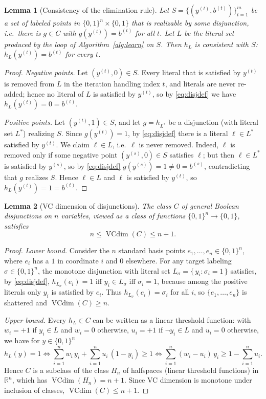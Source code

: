 \documentclass{amsart}
\newtheorem{lemma}{Lemma}
\theoremstyle{definition}
\theoremstyle{remark}
\newcommand{\R}{\mathbb{R}}
\DeclareMathOperator{\VCdim}{VCdim}
\begin{document}
\begin{lemma}[Consistency of the elimination rule]\label{lem:consistent}
Let $S=\{(y^{(t)},b^{(t)})\}_{t=1}^m$ be a set of labeled points in
$\{0,1\}^n\times\{0,1\}$ that is \emph{realizable} by some disjunction, i.e.\
there is $g\in C$ with $g(y^{(t)})=b^{(t)}$ for all $t$. Let $L$ be the literal
set produced by the loop of Algorithm~\ref{alg:learn} on $S$. Then $h_L$ is
consistent with $S$: $h_L(y^{(t)})=b^{(t)}$ for every $t$.
\end{lemma}

\begin{proof}
\emph{Negative points.} Let $(y^{(t)},0)\in S$. Every literal that is satisfied
by $y^{(t)}$ is removed from $L$ in the iteration handling index $t$, and
literals are never re-added; hence no literal of $L$ is satisfied by $y^{(t)}$,
so by \eqref{eq:disjdef} we have $h_L(y^{(t)})=0=b^{(t)}$.

\emph{Positive points.} Let $(y^{(t)},1)\in S$, and let $g=h_{L^*}$ be a
disjunction (with literal set $L^*$) realizing $S$. Since $g(y^{(t)})=1$, by
\eqref{eq:disjdef} there is a literal $\ell\in L^*$ satisfied by $y^{(t)}$. We
claim $\ell\in L$, i.e.\ $\ell$ is never removed. Indeed, $\ell$ is removed only
if some negative point $(y^{(s)},0)\in S$ satisfies $\ell$; but then $\ell\in
L^*$ is satisfied by $y^{(s)}$, so by \eqref{eq:disjdef} $g(y^{(s)})=1\neq
0=b^{(s)}$, contradicting that $g$ realizes $S$. Hence $\ell\in L$ and $\ell$ is
satisfied by $y^{(t)}$, so $h_L(y^{(t)})=1=b^{(t)}$.
\end{proof}

\begin{lemma}[VC dimension of disjunctions]\label{lem:vc}
The class $C$ of general Boolean disjunctions on $n$ variables, viewed as a class
of functions $\{0,1\}^n\to\{0,1\}$, satisfies
\[
n\le \VCdim(C)\le n+1 .
\]
\end{lemma}

\begin{proof}
\emph{Lower bound.} Consider the $n$ standard basis points $e_1,\dots,e_n\in
\{0,1\}^n$, where $e_i$ has a $1$ in coordinate $i$ and $0$ elsewhere. For any
target labeling $\sigma\in\{0,1\}^n$, the monotone disjunction with literal set
$L_\sigma=\{\,y_i:\sigma_i=1\,\}$ satisfies, by \eqref{eq:disjdef},
$h_{L_\sigma}(e_i)=1$ iff $y_i\in L_\sigma$ iff $\sigma_i=1$, because among the
positive literals only $y_i$ is satisfied by $e_i$. Thus
$h_{L_\sigma}(e_i)=\sigma_i$ for all $i$, so $\{e_1,\dots,e_n\}$ is shattered and
$\VCdim(C)\ge n$.

\emph{Upper bound.} Every $h_L\in C$ can be written as a linear threshold
function: with $w_i=+1$ if $y_i\in L$ and $w_i=0$ otherwise, $u_i=+1$ if
$\lnot y_i\in L$ and $u_i=0$ otherwise, we have for $y\in\{0,1\}^n$
\[
h_L(y)=1\iff \sum_{i=1}^n w_i\,y_i+\sum_{i=1}^n u_i\,(1-y_i)\ge 1
\iff \sum_{i=1}^n (w_i-u_i)\,y_i \ge 1-\sum_{i=1}^n u_i .
\]
Hence $C$ is a subclass of the class $H_n$ of halfspaces (linear threshold
functions) in $\R^n$, which has $\VCdim(H_n)=n+1$. Since VC dimension is
monotone under inclusion of classes, $\VCdim(C)\le n+1$.
\end{proof}
\end{document}
